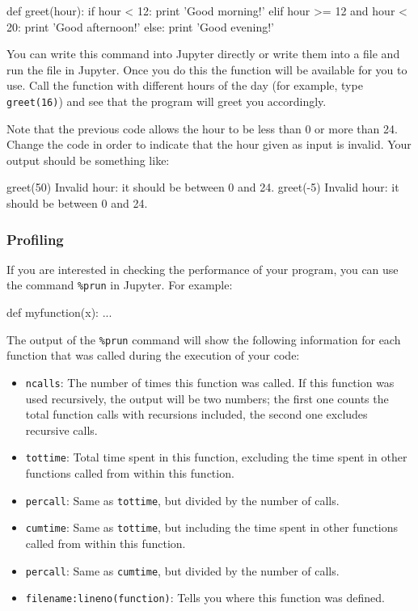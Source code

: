 \begin{python}
def greet(hour):
    if hour < 12:
        print 'Good morning!'
    elif hour >= 12 and hour < 20:
        print 'Good afternoon!'
    else:
        print 'Good evening!'
\end{python}

You can write this command into Jupyter directly or write them into a file and run the file in Jupyter. Once you do this the function will be available for you to use. Call the function  with different hours of the day (for example, type \texttt{greet(16)}) and see that the program will greet you accordingly.

\begin{exercise}
Note that the previous code allows the hour to be less than 0 or more than 24.  Change the code in order to indicate that the hour given as input is invalid.  Your output should be something like:

\begin{python}
greet(50)
Invalid hour: it should be between 0 and 24.
greet(-5)
Invalid hour: it should be between 0 and 24.
\end{python}

\end{exercise}

\subsubsection{Profiling}

If you are interested in checking the performance of your program, you can use the command \texttt{\%prun} in Jupyter. For example:

\begin{python}
def myfunction(x):
    ...

\end{python}

The output of the \texttt{\%prun} command will show the following information
for each function that was called during the execution of your code:

\begin{itemize}
\item \texttt{ncalls}: The number of times this function was called. If this function was used recursively, the output will be two numbers; the first one counts the total function calls with recursions included, the second one excludes recursive calls.
\item \texttt{tottime}: Total time spent in this function, excluding the time spent in other functions called from within this function.
\item \texttt{percall}: Same as \texttt{tottime}, but divided by the number of calls.
\item \texttt{cumtime}: Same as \texttt{tottime}, but including the time spent in other functions called from within this function.
\item \texttt{percall}: Same as \texttt{cumtime}, but divided by the number of calls.
\item \texttt{filename:lineno(function)}: Tells you where this function was defined.
\end{itemize}

